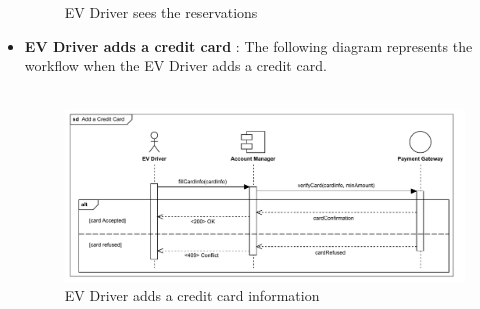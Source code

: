 \begin{itemize}
\begin{figure}[H]
              \caption{EV Driver sees the reservations}
          \end{figure}
          \pagebreak
    \item \textbf{EV Driver adds a credit card} : The following diagram represents the workflow when the EV Driver adds a credit card.\\
          \\
          \begin{figure}[H]
              \centering
              \includegraphics[scale=0.55]{src/runtimeView/eMSP_AddCC.pdf}
              \caption{EV Driver adds a credit card information}
          \end{figure}


\end{itemize}
